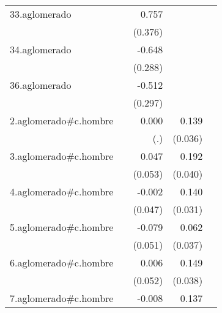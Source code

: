 {\begin{longtable}{l*{4}{D{.}{.}{-1}}}
\addlinespace
33.aglomerado&                     &       0.757\sym{*}  &                     &                     \\
            &                     &     (0.376)         &                     &                     \\
\addlinespace
34.aglomerado&                     &      -0.648\sym{*}  &                     &                     \\
            &                     &     (0.288)         &                     &                     \\
\addlinespace
36.aglomerado&                     &      -0.512         &                     &                     \\
            &                     &     (0.297)         &                     &                     \\
\addlinespace
2.aglomerado#c.hombre&                     &       0.000         &       0.139\sym{***}&                     \\
            &                     &         (.)         &     (0.036)         &                     \\
\addlinespace
3.aglomerado#c.hombre&                     &       0.047         &       0.192\sym{***}&                     \\
            &                     &     (0.053)         &     (0.040)         &                     \\
\addlinespace
4.aglomerado#c.hombre&                     &      -0.002         &       0.140\sym{***}&                     \\
            &                     &     (0.047)         &     (0.031)         &                     \\
\addlinespace
5.aglomerado#c.hombre&                     &      -0.079         &       0.062         &                     \\
            &                     &     (0.051)         &     (0.037)         &                     \\
\addlinespace
6.aglomerado#c.hombre&                     &       0.006         &       0.149\sym{***}&                     \\
            &                     &     (0.052)         &     (0.038)         &                     \\
\addlinespace
7.aglomerado#c.hombre&                     &      -0.008         &       0.137\sym{***}&                     \\

\end{longtable}}

